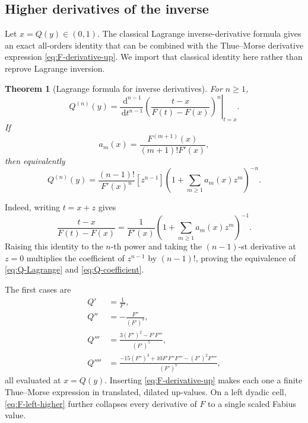 \documentclass[11pt,oneside]{article}
\newtheorem{theorem}{Theorem}[section]
\theoremstyle{definition}
\theoremstyle{remark}
\newcommand{\dd}{\,\mathrm d}
\newcommand{\1}{\mathbf 1}
\begin{document}
\subsection{Higher derivatives of the inverse}
Let \(x=Q(y)\in(0,1)\).  The classical Lagrange inverse-derivative formula
\cite{Comtet} gives an exact all-orders identity that can be combined with the
Thue--Morse derivative expression \eqref{eq:F-derivative-up}.  We import that
classical identity here rather than reprove Lagrange inversion.

\begin{theorem}[Lagrange formula for inverse derivatives]\label{thm:Q-derivatives}
For \(n\geq1\),
\begin{equation}
 \boxed{\quad
 Q^{(n)}(y)=
 \left.\frac{\dd^{n-1}}{\dd t^{n-1}}
 \left(\frac{t-x}{F(t)-F(x)}\right)^n\right|_{t=x}.
 \quad}                                                        \label{eq:Q-Lagrange}
\end{equation}
If
\begin{equation}
 a_m(x)=\frac{F^{(m+1)}(x)}{(m+1)!F'(x)},                       \label{eq:am-inverse}
\end{equation}
then equivalently
\begin{equation}
 Q^{(n)}(y)=\frac{(n-1)!}{F'(x)^n}
 [z^{n-1}]\left(1+\sum_{m\geq1}a_m(x)z^m\right)^{-n}.          \label{eq:Q-coefficient}
\end{equation}
\end{theorem}

Indeed, writing \(t=x+z\) gives
\[
 \frac{t-x}{F(t)-F(x)}
 =\frac1{F'(x)}
 \left(1+\sum_{m\geq1}a_m(x)z^m\right)^{-1}.
\]
Raising this identity to the \(n\)-th power and taking the
\((n-1)\)-st derivative at \(z=0\) multiplies the coefficient of
\(z^{n-1}\) by \((n-1)!\), proving the equivalence of
\eqref{eq:Q-Lagrange} and \eqref{eq:Q-coefficient}.

The first cases are
\begin{align}
 Q'&=\frac1{F'},                                               \label{eq:Q1}\\
 Q''&=-\frac{F''}{(F')^3},                                    \label{eq:Q2}\\
 Q'''&=\frac{3(F'')^2-F'F'''}{(F')^5},                         \label{eq:Q3}\\
 Q''''&=\frac{-15(F'')^3+10F'F''F'''-(F')^2F''''}{(F')^7},     \label{eq:Q4}
\end{align}
all evaluated at \(x=Q(y)\).  Inserting \eqref{eq:F-derivative-up} makes each
one a finite Thue--Morse expression in translated, dilated up-values.  On a
left dyadic cell, \eqref{eq:F-left-higher} further collapses every derivative
of \(F\) to a single scaled Fabius value.
\end{document}
